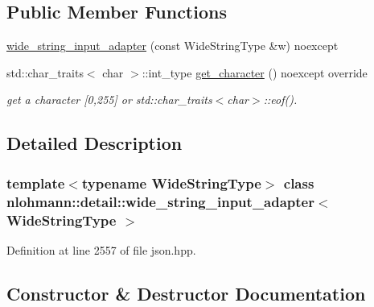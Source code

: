 \subsection*{Public Member Functions}
\begin{DoxyCompactItemize}
\item 
\mbox{\hyperlink{classnlohmann_1_1detail_1_1wide__string__input__adapter_a85c8bddae20bc00d64dd7a2c87109357}{wide\+\_\+string\+\_\+input\+\_\+adapter}} (const Wide\+String\+Type \&w) noexcept
\item 
std\+::char\+\_\+traits$<$ char $>$\+::int\+\_\+type \mbox{\hyperlink{classnlohmann_1_1detail_1_1wide__string__input__adapter_abb62b34cf77e557ce5321b7f2490c3b0}{get\+\_\+character}} () noexcept override
\begin{DoxyCompactList}\small\item\em get a character \mbox{[}0,255\mbox{]} or std\+::char\+\_\+traits$<$char$>$\+::eof(). \end{DoxyCompactList}\end{DoxyCompactItemize}


\subsection{Detailed Description}
\subsubsection*{template$<$typename Wide\+String\+Type$>$\newline
class nlohmann\+::detail\+::wide\+\_\+string\+\_\+input\+\_\+adapter$<$ Wide\+String\+Type $>$}



Definition at line 2557 of file json.\+hpp.



\subsection{Constructor \& Destructor Documentation}
\mbox{\label{classnlohmann_1_1detail_1_1wide__string__input__adapter_a85c8bddae20bc00d64dd7a2c87109357}} 

